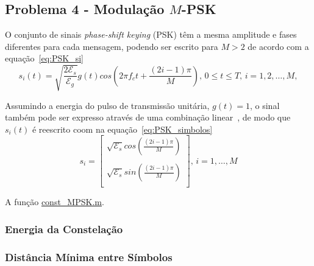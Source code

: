 \subsection{Problema 4 - Modulação \texorpdfstring{$M$}{M}-PSK}

O conjunto de sinais \textit{phase-shift keying} (PSK) têm a mesma amplitude e fases diferentes para cada mensagem, podendo ser escrito para $M > 2$ de acordo com a equação~\ref{eq:PSK_si}
\begin{equation}
    s_i(t) = \sqrt{\frac{2\mathcal{E}_s}{\mathcal{E}_g}} g(t) cos(2\pi f_c t + \frac{(2i-1)\pi}{M}), \, 0 \leq t \leq T, \, i = 1,2,\dots,M,
    \label{eq:PSK_si}
\end{equation}

Assumindo a energia do pulso de transmissão unitária, $g(t) = 1$, o sinal também pode ser expresso através de uma combinação linear~\cite{Cecilio}, de modo que $s_i(t)$ é reescrito coom na equação~\ref{eq:PSK_simbolos}
\begin{equation}
    s_i =   \begin{bmatrix}
                \sqrt{\mathcal{E}_s} cos(\frac{(2i-1)\pi}{M}) \\
                \\ 
                \sqrt{\mathcal{E}_s} sin(\frac{(2i-1)\pi}{M}) \\ 
            \end{bmatrix}, \, i = 1,\dots,M
    \label{eq:PSK_simbolos}
\end{equation}

A função \href{https://raw.githubusercontent.com/lucasabdalah/Courses-HWs/SCD/Sistemas%20de%20Comunicacoes%20Digitais/matlab/problema4/parte1/const_MPSK.m}{const\_MPSK.m}.


\subsubsection*{Energia da Constelação} 

\subsubsection*{Distância Mínima entre Símbolos}


